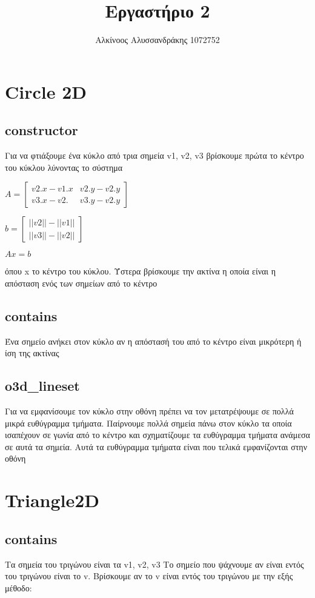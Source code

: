\documentclass{article}
\title{Εργαστήριο 2}
\author{Αλκίνοος Αλυσσανδράκης 1072752}
\date{}
\begin{document}
\maketitle

\section{Circle 2D}
\subsection{constructor}
Για να φτιάξουμε ένα κύκλο από τρια σημεία v1, v2, v3 βρίσκουμε πρώτα το κέντρο
του κύκλου λύνοντας το σύστημα

$
A =
\begin{bmatrix}
	v2.x - v1.x & v2.y - v2.y\\
	v3.x - v2. & v3.y - v2.y
\end{bmatrix}
$

$
b =
\begin{bmatrix}
	|| v2 ||  - || v1 || \\
	|| v3 ||  -  || v2 ||
\end{bmatrix}
$

$ Ax = b$

\noindent
όπου x το κέντρο του κύκλου. Ύστερα βρίσκουμε την ακτίνα η οποία είναι η απόσταση
ενός των σημείων από το κέντρο

\subsection{contains}
Ένα σημείο ανήκει στον κύκλο αν η απόστασή του από το κέντρο είναι μικρότερη ή ίση της ακτίνας

\subsection{o3d\_lineset}
Για να εμφανίσουμε τον κύκλο στην οθόνη πρέπει να τον μετατρέψουμε σε πολλά μικρά ευθύγραμμα
τμήματα. Παίρνουμε πολλά σημεία πάνω στον κύκλο τα οποία ισαπέχουν σε γωνία από το κέντρο
και σχηματίζουμε τα ευθύγραμμα τμήματα ανάμεσα σε αυτά τα σημεία. Αυτά τα ευθύγραμμα
τμήματα είναι που τελικά εμφανίζονται στην οθόνη

\section{Triangle2D}
\subsection{contains}
Τα σημεία του τριγώνου είναι τα v1, v2, v3
Το σημείο που ψάχνουμε αν είναι εντός του τριγώνου είναι το v.
Βρίσκουμε αν το v είναι εντός του τριγώνου με την εξής μέθοδο:
\end{document}
